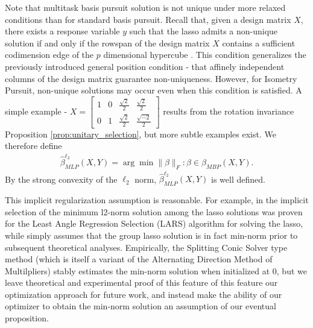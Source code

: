Note that multitask basis pursuit solution is not unique under more relaxed conditions than for standard basis pursuit.
Recall that, given a design matrix $X$, there exists a response variable $y$ such that the lasso admits a non-unique solution if and only if the rowspan of the design matrix $X$ contains a sufficient codimension edge of the $p$ dimensional hypercube \citep{Schneider2022-hi}.
This condition generalizes the previously introduced general position condition - that affinely independent columns of the design matrix guarantee non-uniqueness.
However, for Isometry Pursuit, non-unique solutions may occur even when this condition is satisfied.
A simple example -
$X =
\begin{bmatrix}
1 & 0 & \frac{\sqrt{2}}{2} & \frac{\sqrt{2}}{2}  \\
0 & 1 & \frac{\sqrt{2}}{2} & \frac{\sqrt{-2}}{2}  
\end{bmatrix}$
results from the rotation invariance Proposition \ref{prop:unitary_selection}, but more subtle examples exist.
We therefore define
\begin{align}
\widehat \beta^{\ell_2}_{MLP} (X,Y) = \arg \min \|\beta\|_F : \beta \in \mathcal \beta_{MBP} (X, Y) .
\end{align}
By the strong convexity of the $\ell_2$ norm, $\widehat \beta^{\ell_2}_{MLP} (X,Y)$ is well defined.

This implicit regularization assumption is reasonable.
For example, in \citet{Tibshirani2012-vw} the implicit selection of the minimum l2-norm solution among the lasso solutions was proven for the Least Angle Regression Selection (LARS) algorithm for solving the lasso, while \citet{Mishkin2022-yf,Mishkin2023-yt } simply assumes that the group lasso solution is in fact min-norm prior to subsequent theoretical analyses.
Empirically, the Splitting Conic Solver type method (which is itself a variant of the Alternating Direction Method of Multilpliers) stably estimates the min-norm solution when initialized at $0$, but we leave theoretical and experimental proof of this feature of this feature our optimization approach for future work, and instead make the ability of our optimizer to obtain the min-norm solution an assumption of our eventual proposition.

